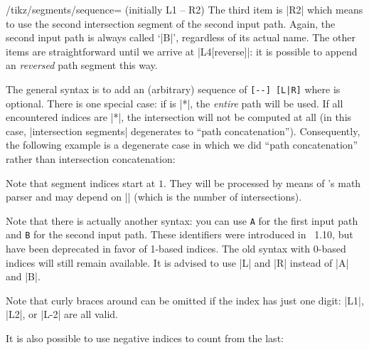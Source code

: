 {\begin{key}{/tikz/segments/sequence= (initially L1 -- R2)}
	The third item is |R2| which means to use the second intersection segment of the second input path. Again, the second input path is always called `|B|', regardless of its actual name. The other items are straightforward until we arrive at |L4[reverse]|: it is possible to append an \emph{reversed} path segment this way.

	The general syntax is to add an (arbitrary) sequence of \verb.[--] [L|R]. where  is optional. There is one special case: if  is |*|, the \emph{entire} path will be used. If all encountered indices are |*|, the intersection will not be computed at all (in this case, |intersection segments| degenerates to ``path concatenation''). Consequently, the following example is a degenerate case in which we did ``path concatenation'' rather than intersection concatenation:
\begin{codeexample}[]
\end{codeexample}

	Note that segment indices start at $1$. They will be processed by means of \pgfname's math parser and may depend on |\pgfintersectionsolutions| (which is the number of intersections).
	
	Note that there is actually another syntax: you can use \texttt{A} for the first input path and \texttt{B} for the second input path. These identifiers were introduced in \PGFPlots\ 1.10, but have been deprecated in favor of 1-based indices. The old syntax with 0-based indices will still remain available. It is advised to use |L| and |R| instead of |A| and |B|.

	Note that curly braces around  can be omitted if the index has just one digit: |L1|, |L2|, or |L-2| are all valid.
	
	It is also possible to use negative indices to count from the last:

\begin{codeexample}[]
\end{codeexample}
\end{key}}
